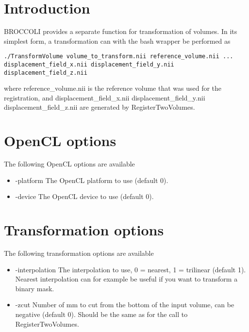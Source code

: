 \section{Introduction}

BROCCOLI provides a separate function for transformation of volumes. In its simplest form, a transformation can with the bash wrapper be performed as

\begin{verbatim}
./TransformVolume volume_to_transform.nii reference_volume.nii ... 
displacement_field_x.nii displacement_field_y.nii displacement_field_z.nii
\end{verbatim}

where reference\_volume.nii is the reference volume that was used for the registration, and displacement\_field\_x.nii displacement\_field\_y.nii displacement\_field\_z.nii are generated by RegisterTwoVolumes.

\section{OpenCL options}

The following OpenCL options are available

\begin{itemize}

\item -platform
\newline \newline The OpenCL platform to use (default 0).

\item -device
\newline \newline The OpenCL device to use (default 0).

\end{itemize}

\newpage

\section{Transformation options}

The following transformation options are available

\begin{itemize}

\item -interpolation
\newline \newline The interpolation to use, 0 = nearest, 1 = trilinear (default 1). Nearest interpolation can for example be useful if you want to transform a binary mask.

\item -zcut
\newline \newline Number of mm to cut from the bottom of the input volume, can be negative (default 0). Should be the same as for the call to RegisterTwoVolumes.

\end{itemize}

